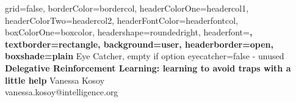 \documentclass[a0paper,portrait]{baposter}
\begin{document}


\begin{poster}{
        grid=false,
        borderColor=bordercol,
        headerColorOne=headercol1,
        headerColorTwo=headercol2,
        headerFontColor=headerfontcol,
        boxColorOne=boxcolor,
        headershape=roundedright,
        headerfont=\Large\sf\bf,
        textborder=rectangle,
        background=user,
        headerborder=open,
  boxshade=plain
}
{
        Eye Catcher, empty if option eyecatcher=false - unused
}
{\sf\bf
        Delegative Reinforcement Learning: learning to avoid traps with a little help
}
{
        \vspace{1em} Vanessa Kosoy\\
        {\smaller vanessa.kosoy@intelligence.org}
}

{
\setlength\fboxsep{0pt}
\setlength\fboxrule{0.5pt}
        \fbox{
        \begin{minipage}{14em}
        \end{minipage}
}
}


\end{poster}
\end{document}
